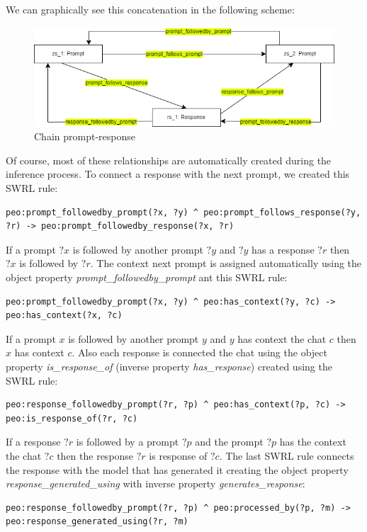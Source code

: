 We can graphically see this concatenation in the following scheme:
\begin{figure}[H]
    \centering
    \includegraphics[width=0.9\linewidth]{Figures/fig_30.png}
    \caption{Chain prompt-response}
    \label{fig:enter-label}
\end{figure}
Of course, most of these relationships are automatically created during the inference process. To connect a response with the next prompt, we created this SWRL rule:
\begin{lstlisting}
peo:prompt_followedby_prompt(?x, ?y) ^ peo:prompt_follows_response(?y, ?r) -> peo:prompt_followedby_response(?x, ?r)
\end{lstlisting}
If a prompt $?x$ is followed by another prompt $?y$ and $?y$ has a response $?r$ then $?x$ is followed by $?r$. The context next prompt is assigned automatically using the object property \textit{prompt\_followedby\_prompt} ant this SWRL rule:
\begin{lstlisting}
peo:prompt_followedby_prompt(?x, ?y) ^ peo:has_context(?y, ?c) -> peo:has_context(?x, ?c)
\end{lstlisting}
If a prompt $x$ is followed by another prompt $y$ and $y$ has context the chat $c$ then $x$ has context $c$. Also each response is connected the chat using the object property \textit{is\_response\_of} (inverse property \textit{has\_response}) created using the SWRL rule:
\begin{lstlisting}
peo:response_followedby_prompt(?r, ?p) ^ peo:has_context(?p, ?c) -> peo:is_response_of(?r, ?c)
\end{lstlisting}
If a response $?r$ is followed by a prompt $?p$ and the prompt $?p$ has the context the chat $?c$ then the response $?r$ is response of $?c$. The last SWRL rule connects the response with the model that has generated it creating the object property \textit{response\_generated\_using} with inverse property \textit{generates\_response}:
\begin{lstlisting}
peo:response_followedby_prompt(?r, ?p) ^ peo:processed_by(?p, ?m) -> peo:response_generated_using(?r, ?m) 
\end{lstlisting}
